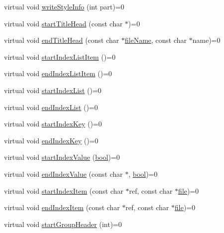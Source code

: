 \begin{DoxyCompactItemize}
\item 
virtual void \hyperlink{class_output_generator_ab3319043929bc785eeb2edfbeadc5088}{write\+Style\+Info} (int part)=0
\item 
virtual void \hyperlink{class_output_generator_a2a88fa84eb821cbc46ebe77293db0564}{start\+Title\+Head} (const char $\ast$)=0
\item 
virtual void \hyperlink{class_output_generator_a77b6fef939339086beec891ac1769781}{end\+Title\+Head} (const char $\ast$\hyperlink{class_output_generator_a9bb808101dbeae7732bb0fa66cad9176}{file\+Name}, const char $\ast$name)=0
\item 
virtual void \hyperlink{class_output_generator_a620605e68ebc9176a544eda7073bf039}{start\+Index\+List\+Item} ()=0
\item 
virtual void \hyperlink{class_output_generator_ac4911ae06d09bc207a4e0f9da24516bc}{end\+Index\+List\+Item} ()=0
\item 
virtual void \hyperlink{class_output_generator_adc617e6eaee65cfad74e0b8c07aab27d}{start\+Index\+List} ()=0
\item 
virtual void \hyperlink{class_output_generator_af6f79555b9c01ffcf0d119d483271aa5}{end\+Index\+List} ()=0
\item 
virtual void \hyperlink{class_output_generator_a6db4df81706e050d26df7083977e5da9}{start\+Index\+Key} ()=0
\item 
virtual void \hyperlink{class_output_generator_a5c036e61acf5fe91e2372b16263fef5c}{end\+Index\+Key} ()=0
\item 
virtual void \hyperlink{class_output_generator_a8b7df4e8d1c8c35c96ed72a1dd88dfc3}{start\+Index\+Value} (\hyperlink{qglobal_8h_a1062901a7428fdd9c7f180f5e01ea056}{bool})=0
\item 
virtual void \hyperlink{class_output_generator_a197393fc4473bb893a83f36369df1552}{end\+Index\+Value} (const char $\ast$, \hyperlink{qglobal_8h_a1062901a7428fdd9c7f180f5e01ea056}{bool})=0
\item 
virtual void \hyperlink{class_output_generator_afbc31c1a5eaecbcf45e16c4a16d747f7}{start\+Index\+Item} (const char $\ast$ref, const char $\ast$\hyperlink{class_output_generator_aed5ad11c3844cdf71ec6fee6c1c84286}{file})=0
\item 
virtual void \hyperlink{class_output_generator_ad573d99d60efb03de6afcec74237b89c}{end\+Index\+Item} (const char $\ast$ref, const char $\ast$\hyperlink{class_output_generator_aed5ad11c3844cdf71ec6fee6c1c84286}{file})=0
\item 
virtual void \hyperlink{class_output_generator_a567cedbeeb6ffa8f65893976e4c246d9}{start\+Group\+Header} (int)=0

\end{DoxyCompactItemize}
